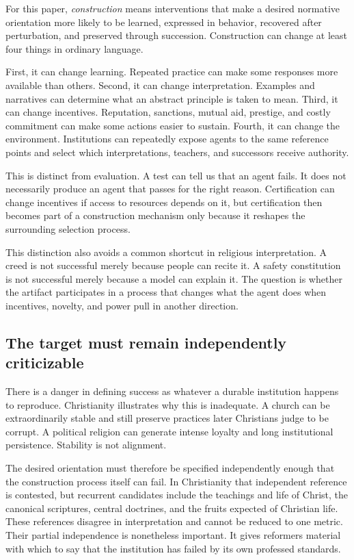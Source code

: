 \documentclass[11pt]{article}
\begin{document}
For this paper, \emph{construction} means interventions that make a desired normative orientation more likely to be learned, expressed in behavior, recovered after perturbation, and preserved through succession. Construction can change at least four things in ordinary language.

First, it can change learning. Repeated practice can make some responses more available than others. Second, it can change interpretation. Examples and narratives can determine what an abstract principle is taken to mean. Third, it can change incentives. Reputation, sanctions, mutual aid, prestige, and costly commitment can make some actions easier to sustain. Fourth, it can change the environment. Institutions can repeatedly expose agents to the same reference points and select which interpretations, teachers, and successors receive authority.

This is distinct from evaluation. A test can tell us that an agent fails. It does not necessarily produce an agent that passes for the right reason. Certification can change incentives if access to resources depends on it, but certification then becomes part of a construction mechanism only because it reshapes the surrounding selection process.

This distinction also avoids a common shortcut in religious interpretation. A creed is not successful merely because people can recite it. A safety constitution is not successful merely because a model can explain it. The question is whether the artifact participates in a process that changes what the agent does when incentives, novelty, and power pull in another direction.

\subsection{The target must remain independently criticizable}

There is a danger in defining success as whatever a durable institution happens to reproduce. Christianity illustrates why this is inadequate. A church can be extraordinarily stable and still preserve practices later Christians judge to be corrupt. A political religion can generate intense loyalty and long institutional persistence. Stability is not alignment.

The desired orientation must therefore be specified independently enough that the construction process itself can fail. In Christianity that independent reference is contested, but recurrent candidates include the teachings and life of Christ, the canonical scriptures, central doctrines, and the fruits expected of Christian life. These references disagree in interpretation and cannot be reduced to one metric. Their partial independence is nonetheless important. It gives reformers material with which to say that the institution has failed by its own professed standards.
\end{document}
